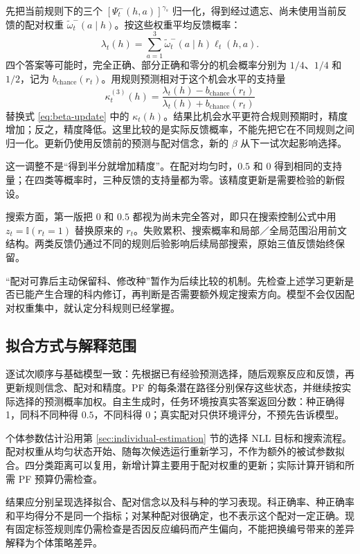 \documentclass[12pt]{article}
\newcommand{\ind}{\mathbb I}
\begin{document}
先把当前规则下的三个 $[\Psi_t^{-}(h,a)]^{\gamma_s}$ 归一化，得到经过遗忘、尚未使用当前反馈的配对权重 $\widetilde\omega_t^{-}(a\mid h)$。按这些权重平均反馈概率：
\begin{equation}
\lambda_t(h)=\sum_{a=1}^{3}\widetilde\omega_t^{-}(a\mid h)\ell_t(h,a).
\label{eq:c3-marginal-feedback}
\end{equation}
四个答案等可能时，完全正确、部分正确和零分的机会概率分别为 $1/4$、$1/4$ 和 $1/2$，记为 $b_{\mathrm{chance}}(r_t)$。用规则预测相对于这个机会水平的支持量
\begin{equation}
\kappa_t^{(3)}(h)=
\frac{\lambda_t(h)-b_{\mathrm{chance}}(r_t)}
{\lambda_t(h)+b_{\mathrm{chance}}(r_t)}
\label{eq:c3-beta-support}
\end{equation}
替换式 \eqref{eq:beta-update} 中的 $\kappa_t(h)$。结果比机会水平更符合规则预期时，精度增加；反之，精度降低。这里比较的是实际反馈概率，不能先把它在不同规则之间归一化。更新仍使用反馈前的预测与配对信念，新的 $\beta$ 从下一试次起影响选择。

这一调整不是“得到半分就增加精度”。在配对均匀时，$0.5$ 和 0 得到相同的支持量；在四类等概率时，三种反馈的支持量都为零。该精度更新是需要检验的新假设。

搜索方面，第一版把 0 和 $0.5$ 都视为尚未完全答对，即只在搜索控制公式中用 $z_t=\ind(r_t=1)$ 替换原来的 $r_t$。失败累积、搜索概率和局部／全局范围沿用前文结构。两类反馈仍通过不同的规则后验影响后续局部搜索，原始三值反馈始终保留。

“配对可靠后主动保留科、修改种”暂作为后续比较的机制。先检查上述学习更新是否已能产生合理的科内修订，再判断是否需要额外规定搜索方向。模型不会仅因配对权重集中，就认定分科规则已经掌握。

\subsection{拟合方式与解释范围}

逐试次顺序与基础模型一致：先根据已有经验预测选择，随后观察反应和反馈，再更新规则信念、配对和精度。PF 的每条潜在路径分别保存这些状态，并继续按实际选择的预测概率加权。自主生成时，任务环境按真实答案返回分数：种正确得 1，同科不同种得 $0.5$，不同科得 0；真实配对只供环境评分，不预先告诉模型。

个体参数估计沿用第 \ref{sec:individual-estimation} 节的选择 NLL 目标和搜索流程。配对权重从均匀状态开始、随每次候选运行重新学习，不作为额外的被试参数拟合。四分类距离可以复用，新增计算主要用于配对权重的更新；实际计算开销和所需 PF 预算仍需检查。

结果应分别呈现选择拟合、配对信念以及科与种的学习表现。科正确率、种正确率和平均得分不是同一个指标；对某种配对很确定，也不表示这个配对一定正确。现有固定标签规则库仍需检查是否因反应编码而产生偏向，不能把换编号带来的差异解释为个体策略差异。
\end{document}
